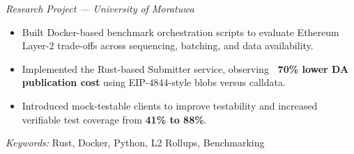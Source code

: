 \noindent
{}

\noindent
\textit{Research Project — University of Moratuwa}

\begin{itemize}
    \item Built Docker-based benchmark orchestration scripts to evaluate Ethereum Layer-2 trade-offs across sequencing, batching, and data availability.
    \item Implemented the Rust-based Submitter service, observing \textbf{~70\% lower DA publication cost} using EIP-4844-style blobs versus calldata.
    \item Introduced mock-testable clients to improve testability and increased verifiable test coverage from \textbf{41\% to 88\%}.
\end{itemize}

\noindent
\textit{Keywords:} Rust, Docker, Python, L2 Rollups, Benchmarking
